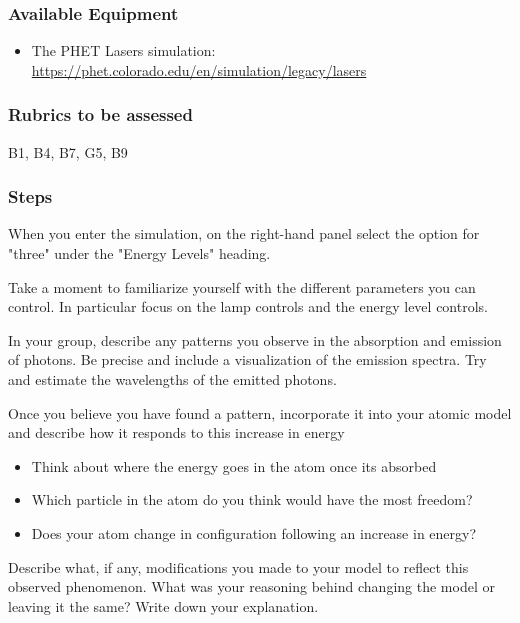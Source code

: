 \subsubsection{Available Equipment}

\begin{itemize}
	\item The PHET Lasers simulation: \url{https://phet.colorado.edu/en/simulation/legacy/lasers}
\end{itemize} 

\subsubsection{Rubrics to be assessed}

B1, B4, B7, G5, B9

\subsubsection{Steps}

\begin{steps} %
	\item When you enter the simulation, on the right-hand panel select the option for "three" under the "Energy Levels" heading.
	
	\item Take a moment to familiarize yourself with the different parameters you can control. In particular focus on the lamp controls and the energy level controls. 
	
	\item In your group, describe any patterns you observe in the absorption and emission of photons. Be precise and include a visualization of the emission spectra. Try and estimate the wavelengths of the emitted photons. 
	
	\item Once you believe you have found a pattern, incorporate it into your atomic model and describe how it responds to this increase in energy
	\begin{itemize}
		\item Think about where the energy goes in the atom once its absorbed
		
		\item Which particle in the atom do you think would have the most freedom?
		
		\item Does your atom change in configuration following an increase in energy? 
	\end{itemize}

	\item Describe what, if any, modifications you made to your model to reflect this observed phenomenon. What was your reasoning behind changing the model or leaving it the same? Write down your explanation.  
\end{steps}

